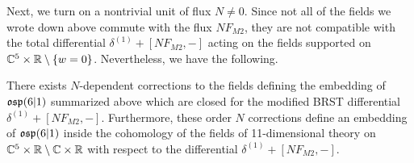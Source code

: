 \parsec[]

Next, we turn on a nontrivial unit of flux $N \ne 0$. 
Since not all of the fields we wrote down above commute with the flux $N F_{M2}$, they are not compatible with the total differential $\delta^{(1)} + [N F_{M2}, -]$ acting on the fields supported on $\mathbb C^5 \times \mathbb R \setminus \{w=0\}$. 
Nevertheless, we have the following. 

\begin{prop}
\label{prop:brads4}
There exists $N$-dependent corrections to the fields defining the embedding of $\mathfrak{osp}(6|1)$ summarized above which are closed for the modified BRST differential $\delta^{(1)} + [N F_{M2},-]$. 
Furthermore, these order $N$ corrections define an embedding of $\mathfrak{osp}(6|1)$ inside the cohomology of the fields of 11-dimensional theory on $\mathbb C^5 \times \mathbb R \setminus \mathbb C \times \mathbb R$ with respect to the differential $\delta^{(1)} + [N F_{M2},-]$.
\end{prop}


